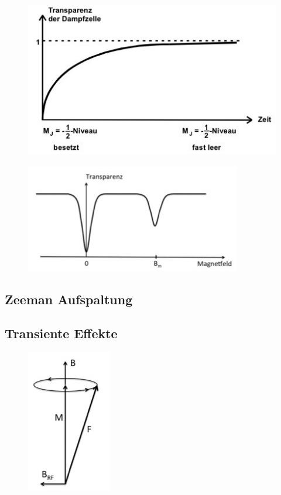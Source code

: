 \begin{figure}[H]
	\centering
	\includegraphics[width=0.6\linewidth]{content/grafik/transparenz.jpg}
	\caption{\cite{pumpen}}
	\label{fig:transparenz}
\end{figure}

\begin{figure}[H]
	\centering
	\includegraphics[width=0.6\linewidth]{content/grafik/minima.jpg}
	\caption{\cite{pumpen}}
	\label{fig:minima}
\end{figure}

\subsection{Zeeman Aufspaltung}

\subsection{Transiente Effekte}

\begin{figure}[H]
	\centering
	\includegraphics[width=0.2\linewidth]{content/grafik/praezession.jpg}
	\caption{\cite{pumpen}}
	\label{fig:praezession}
\end{figure}


